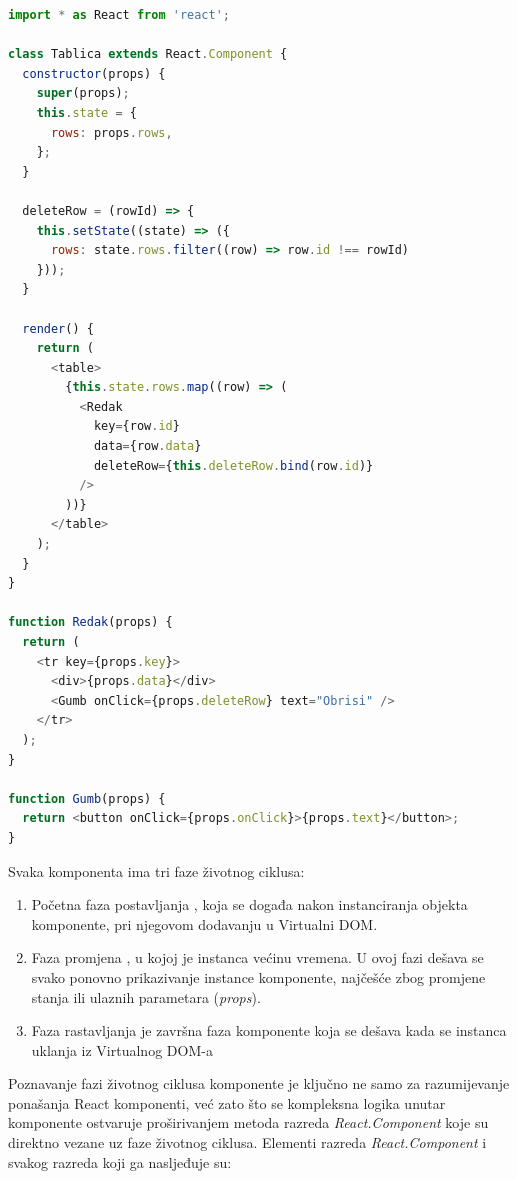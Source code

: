 \documentclass[times, utf8, diplomski, numeric]{fer}
\newcommand{\razmakp}{\vspace{18pt}}
\newcommand{\razmaks}{\vspace{10pt}}
\begin{document}
\razmakp %
\begin{lstlisting}[language=JavaScript, caption={Primjer prosljeđivanja podataka i akcija iz roditeljske komponente}, label={lst:component_props}]
import * as React from 'react';

class Tablica extends React.Component {
  constructor(props) {
    super(props);
    this.state = {
      rows: props.rows,
    };
  }

  deleteRow = (rowId) => {
    this.setState((state) => ({
      rows: state.rows.filter((row) => row.id !== rowId)
    }));
  }

  render() {
    return (
      <table>
        {this.state.rows.map((row) => (
          <Redak
            key={row.id}
            data={row.data}
            deleteRow={this.deleteRow.bind(row.id)}
          />
        ))}
      </table>
    );
  }
}

function Redak(props) {
  return (
    <tr key={props.key}>
      <div>{props.data}</div>
      <Gumb onClick={props.deleteRow} text="Obrisi" />
    </tr>
  );
}

function Gumb(props) {
  return <button onClick={props.onClick}>{props.text}</button>;
}
\end{lstlisting}
\razmaks

\noindent Svaka komponenta ima tri faze životnog ciklusa:

\begin{enumerate}
    \item Početna faza postavljanja , koja se događa nakon instanciranja objekta komponente, pri njegovom dodavanju u Virtualni DOM.
    \item Faza promjena , u kojoj je instanca većinu vremena. U ovoj fazi dešava se svako ponovno prikazivanje  instance komponente, najčešće zbog promjene stanja ili ulaznih parametara (\emph{props}).
    \item Faza rastavljanja  je završna faza komponente koja se dešava kada se instanca uklanja iz Virtualnog DOM-a
\end{enumerate}

\noindent Poznavanje fazi životnog ciklusa komponente je ključno ne samo za razumijevanje ponašanja React komponenti, već zato što se kompleksna logika unutar komponente ostvaruje proširivanjem metoda razreda \emph{React.Component} koje su direktno vezane uz faze životnog ciklusa.
Elementi razreda \emph{React.Component} i svakog razreda koji ga nasljeđuje su\citep{react_docs}:
\end{document}
